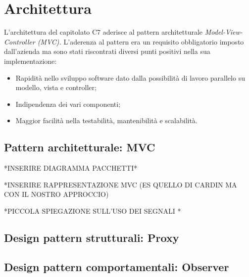 \section{Architettura}
L'architettura del capitolato C7 aderisce al pattern architetturale \textit{Model-View-Controller (MVC).} L'aderenza al pattern era un requisito obbligatorio imposto dall'azienda ma sono stati riscontrati diversi punti positivi nella sua implementazione:

\begin{itemize}
	\item Rapidità nello sviluppo software dato dalla possibilità di lavoro parallelo su modello, vista e controller;
	\item Indipendenza dei vari componenti;
	\item Maggior facilità nella testabilità, mantenibilità e scalabilità.

\end{itemize}
\subsection{Pattern architetturale: MVC}

*INSERIRE DIAGRAMMA PACCHETTI*

*INSERIRE RAPPRESENTAZIONE MVC (ES QUELLO DI CARDIN MA CON IL NOSTRO APPROCCIO)

*PICCOLA SPIEGAZIONE SULL'USO DEI SEGNALI *

\subsection{Design pattern strutturali: Proxy}


\subsection{Design pattern comportamentali: Observer}
